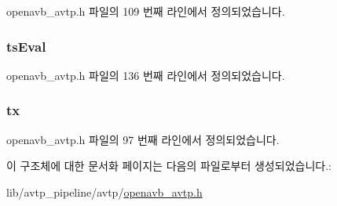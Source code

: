 openavb\+\_\+avtp.\+h 파일의 109 번째 라인에서 정의되었습니다.

\subsubsection[{\texorpdfstring{ts\+Eval}{tsEval}}]{ ts\+Eval}\hypertarget{structavtp__stream__t_ac4e4017bf67519fe0d817ab545496aad}{}\label{structavtp__stream__t_ac4e4017bf67519fe0d817ab545496aad}


openavb\+\_\+avtp.\+h 파일의 136 번째 라인에서 정의되었습니다.

\subsubsection[{\texorpdfstring{tx}{tx}}]{ tx}\hypertarget{structavtp__stream__t_a3b1e88519ca75747960d51b86b2c5e95}{}\label{structavtp__stream__t_a3b1e88519ca75747960d51b86b2c5e95}


openavb\+\_\+avtp.\+h 파일의 97 번째 라인에서 정의되었습니다.



이 구조체에 대한 문서화 페이지는 다음의 파일로부터 생성되었습니다.\+:\begin{DoxyCompactItemize}
\item 
lib/avtp\+\_\+pipeline/avtp/\hyperlink{openavb__avtp_8h}{openavb\+\_\+avtp.\+h}\end{DoxyCompactItemize}
